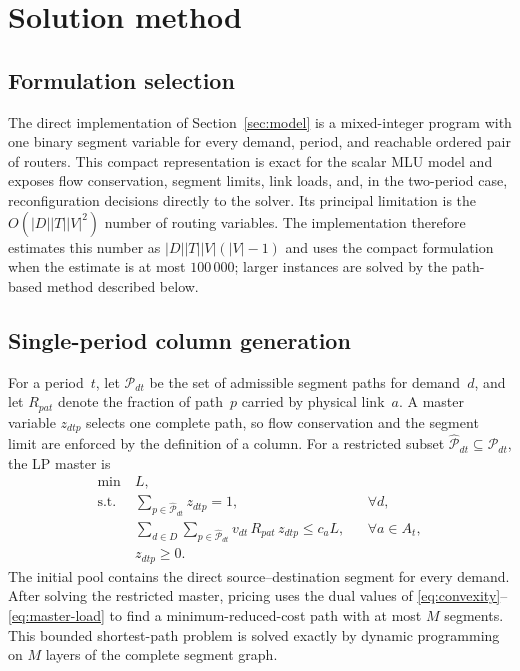 \section{Solution method}
\label{sec:method}

\subsection{Formulation selection}

The direct implementation of Section~\ref{sec:model} is a mixed-integer program with one binary segment
variable for every demand, period, and reachable ordered pair of routers. This compact representation
is exact for the scalar MLU model and exposes flow conservation, segment limits, link loads, and, in
the two-period case, reconfiguration decisions directly to the solver. Its principal limitation is the
$O(|D||T||V|^2)$ number of routing variables. The implementation therefore estimates this number as
$|D||T||V|(|V|-1)$ and uses the compact formulation when the estimate is at most $100\,000$; larger
instances are solved by the path-based method described below.

\subsection{Single-period column generation}

For a period~$t$, let $\mathcal{P}_{dt}$ be the set of admissible segment paths for demand~$d$, and
let $R_{pat}$ denote the fraction of path~$p$ carried by physical link~$a$. A master variable
$z_{dtp}$ selects one complete path, so flow conservation and the segment limit are enforced by the
definition of a column. For a restricted subset $\widehat{\mathcal{P}}_{dt}\subseteq\mathcal{P}_{dt}$,
the LP master is
\begin{align}
\min\ & L, \nonumber\\
\text{s.t.}\ & \sum_{p\in\widehat{\mathcal{P}}_{dt}} z_{dtp}=1, && \forall d, \label{eq:convexity}\\
& \sum_{d\in D}\sum_{p\in\widehat{\mathcal{P}}_{dt}} v_{dt}\,R_{pat}\,z_{dtp}\le c_a L, && \forall a\in A_t, \label{eq:master-load}\\
& z_{dtp}\ge 0. \nonumber
\end{align}
The initial pool contains the direct source--destination segment for every demand. After solving the
restricted master, pricing uses the dual values of \eqref{eq:convexity}--\eqref{eq:master-load} to
find a minimum-reduced-cost path with at most $M$ segments. This bounded shortest-path problem is
solved exactly by dynamic programming on $M$ layers of the complete segment graph.

